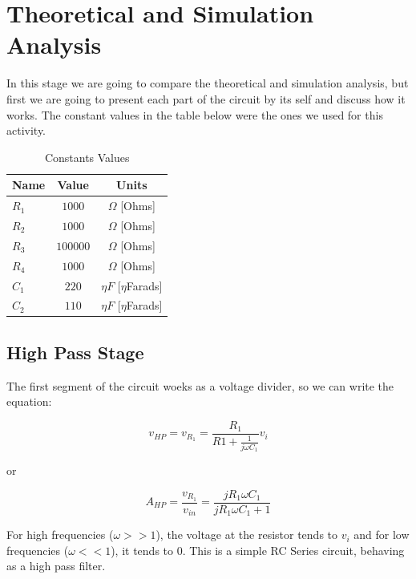 \section{Theoretical and Simulation Analysis}
\label{sec:analysis}

In this stage we are going to compare the theoretical and simulation analysis, but first we are going to present each part of the circuit by its self and discuss how it works. The constant values in the table below were the ones we used for this activity.

\begin{table}[h]
    \centering
    \begin{tabular}{|l|c|c|}
    \hline
    {\bf Name} & {\bf Value} & {\bf Units} \\ \hline
    $R_1$ & $1000$ & $\Omega$ [Ohms] \\ \hline
    $R_2$ & $1000$ & $\Omega$ [Ohms] \\ \hline
    $R_3$ & $100000$ & $\Omega$ [Ohms] \\ \hline
    $R_4$ & $1000$ & $\Omega$ [Ohms] \\ \hline
    $C_1$ & $220$ & $\eta F$ [$\eta$Farads]\\ \hline
    $C_2$ & $110$ & $\eta F$ [$\eta$Farads] \\ \hline
    \end{tabular}
    \caption[Constants Values]{Constants Values}
    \label{tab:constants}
\end{table}


\subsection{High Pass Stage}
\label{subsec:stat}
The first segment of the circuit woeks as a voltage divider, so we can write the equation:

\begin{equation}
    v_{HP}=v_{R_1}=\frac{R_1}{R1+\frac{1}{j\omega C_1}}v_i
\end{equation}

or

\begin{equation}
    A_{HP}=\frac{v_{R_1}}{v_{in}}=\frac{j R_1 \omega C_1}{j R_1 \omega C_1 + 1}
\end{equation}

For high frequencies ($\omega >> 1$), the voltage at the resistor tends to $v_i$ and for low frequencies ($\omega << 1$), it tends to 0.
This is a simple RC Series circuit, behaving as a high pass filter.


